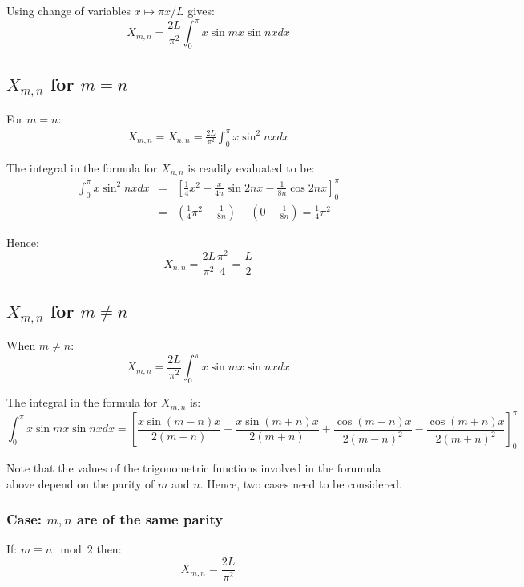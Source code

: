 \documentclass[12pt]{article}
\begin{document}
\noindent Using change of variables $x \mapsto \pi x / L$ gives:
\begin{equation}
X_{m, n} = \frac{2L}{\pi^2} \int_{0}^{\pi} x \sin mx \sin nx dx
\end{equation}


\subsection{$X_{m, n}$ for $m=n$}
For $m=n$:
\begin{eqnarray}
X_{m, n} = X_{n, n}  = \frac{2L}{\pi^2} \int_{0}^{\pi} x \sin^2 nx dx
\end{eqnarray}

\noindent The integral in the formula for $X_{n, n}$ is readily evaluated to be:
\begin{eqnarray*}
\int_0^{\pi} x \sin^2 nx dx &=& \left[ 
\frac{1}{4} x^2 - \frac{x}{4n} \sin 2nx - \frac{1}{8n} \cos 2nx 
\right]_{0}^{\pi} \\
 &=& \left( \frac{1}{4} \pi^2 - \frac{1}{8n} \right) - \left(0 - \frac{1}{8n} \right) = \frac{1}{4} \pi^2
\end{eqnarray*}

\noindent Hence:
\begin{equation}
X_{n, n} = \frac{2L}{\pi^2} \frac{\pi^2}{4} = \frac{L}{2}
\end{equation}


\subsection{$X_{m, n}$ for $m \neq n$}
When $m \neq n$:
\begin{equation}
X_{m, n} = \frac{2L}{\pi^2} \int_{0}^{\pi} x \sin mx \sin nx dx
\end{equation}

\noindent The integral in the formula for $X_{m, n}$ is:
\begin{dmath*}
\int_{0}^{\pi} x \sin mx \sin nx dx = \left[ \frac{x\sin(m-n) x}{2(m-n)} - \frac{x \sin(m+n)x}{2(m+n)}  + \frac{\cos(m-n)x}{2(m-n)^2}  - \frac{\cos(m+n)x}{2(m+n)^2} \right]^{\pi}_{0} 
\end{dmath*}

\noindent Note that the values of the trigonometric functions involved in the forumula above depend on the parity of $m$ and $n$. Hence, two cases need to be considered.

\subsubsection{Case: $m, n$ are of the same parity}
If: $m \equiv n \mod 2$ then:
\begin{equation}
X_{m,n} = \frac{2L}{\pi^2} 
\end{equation}
\end{document}

